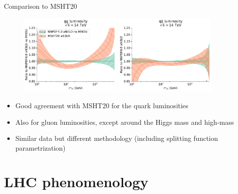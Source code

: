 \documentclass[aspectratio=169, 9pt,t]{beamer}
\begin{document}
\begin{frame}{Comparison to MSHT20}
  \begin{figure}[!t]
    \centering
    \includegraphics[width=0.45\textwidth]{figures/gg_plot_lumi1d_msht20.pdf}
    \includegraphics[width=0.45\textwidth]{figures/qqbar_plot_lumi1d_msht20.pdf}
  \end{figure}
  \begin{itemize}
    \item Good agreement with MSHT20 for the quark luminosities
    \item Also for gluon luminosities, except around the Higgs mass and high-mass
    \item Similar data but different methodology (including splitting function parametrization)
  \end{itemize}
\end{frame}


\section{LHC phenomenology}
\end{document}

